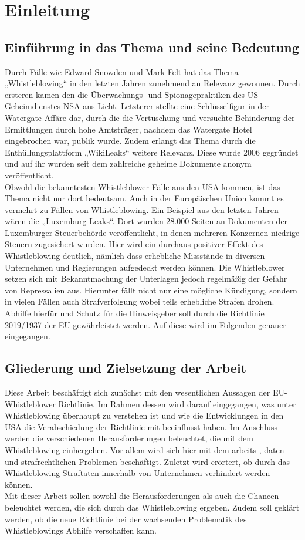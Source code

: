 \section{Einleitung}
\label{sec:Einleitung}

\subsection{Einführung in das Thema und seine Bedeutung}
Durch Fälle wie Edward Snowden und Mark Felt hat das Thema „Whistleblowing“ in den letzten Jahren zunehmend an Relevanz gewonnen.
Durch ersteren kamen den die Überwachungs- und Spionagepraktiken des US-Geheimdienstes NSA ans Licht.
Letzterer stellte eine Schlüsselfigur in der Watergate-Affäre dar, durch die die Vertuschung und versuchte Behinderung der Ermittlungen durch hohe Amtsträger, nachdem das Watergate Hotel eingebrochen war, publik wurde.
Zudem erlangt das Thema durch die Enthüllungsplattform „WikiLeaks“ weitere Relevanz.
Diese wurde 2006 gegründet und auf ihr wurden seit dem zahlreiche geheime Dokumente anonym veröffentlicht.\\
Obwohl die bekanntesten Whistleblower Fälle aus den USA kommen, ist das Thema nicht nur dort bedeutsam.
Auch in der Europäischen Union kommt es vermehrt zu Fällen von Whistleblowing.
Ein Beispiel aus den letzten Jahren wären die „Luxemburg-Leaks“.
Dort wurden 28.000 Seiten an Dokumenten der Luxemburger Steuerbehörde veröffentlicht, in denen mehreren Konzernen niedrige Steuern zugesichert wurden.
Hier wird ein durchaus positiver Effekt des Whistleblowing deutlich, nämlich dass erhebliche Missstände in diversen Unternehmen und Regierungen aufgedeckt werden können.
Die Whistleblower setzen sich mit Bekanntmachung der Unterlagen jedoch regelmäßig der Gefahr von Repressalien aus.
Hierunter fällt nicht nur eine mögliche Kündigung, sondern in vielen Fällen auch Strafverfolgung wobei teils erhebliche Strafen drohen.\\
Abhilfe hierfür und Schutz für die Hinweisgeber soll durch die Richtlinie 2019/1937 der EU gewährleistet werden.
Auf diese wird im Folgenden genauer eingegangen.

\subsection{Gliederung und Zielsetzung der Arbeit}
Diese Arbeit beschäftigt sich zunächst mit den wesentlichen Aussagen der EU-Whistleblower Richtlinie. 
Im Rahmen dessen wird darauf eingegangen, was unter Whistleblowing überhaupt zu verstehen ist und wie die Entwicklungen in den USA die Verabschiedung der Richtlinie mit beeinflusst haben.
Im Anschluss werden die verschiedenen Herausforderungen beleuchtet, die mit dem Whistleblowing einhergehen.
Vor allem wird sich hier mit dem arbeits-, daten- und strafrechtlichen Problemen beschäftigt.
Zuletzt wird erörtert, ob durch das Whistleblowing Straftaten innerhalb von Unternehmen verhindert werden können.\\
Mit dieser Arbeit sollen sowohl die Herausforderungen als auch die Chancen beleuchtet werden, die sich durch das Whistleblowing ergeben. 
Zudem soll geklärt werden, ob die neue Richtlinie bei der wachsenden Problematik des Whistleblowings Abhilfe verschaffen kann.
